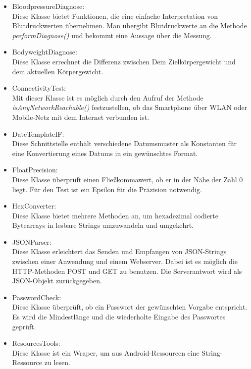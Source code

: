 \begin{itemize}
 \item BloodpressureDiagnose:\\
 Diese Klasse bietet Funktionen, die eine einfache Interpretation von Blutdruckwerten \"ubernehmen.
 Man \"ubergibt Blutdruckwerte an die Methode \emph{performDiagnose()} und bekommt eine Aussage \"uber die Messung.
  
 \item BodyweightDiagnose:\\
 Diese Klasse errechnet die Differenz zwischen Dem Zielk\"orpergewicht und dem aktuellen K\"orpergewicht.
 
 \item ConnectivityTest:\\
 Mit dieser Klasse ist es m\"oglich durch den Aufruf der Methode \emph{isAnyNetworkReachable()} festzustellen,
 ob das Smartphone \"uber WLAN oder Mobile-Netz mit dem Internet verbunden ist.
 
 \item DateTemplateIF:\\
 Diese Schnittstelle enth\"alt verschiedene Datumsmuster als Konstanten f\"ur eine Konvertierung eines Datums in ein 
 gew\"unschtes Format.
 \item FloatPrecision:\\
 Diese Klasse \"uberpr\"uft einen Flie\ss{}kommawert, ob er in der N\"ahe der Zahl 0 liegt. 
 F\"ur den Test ist ein Epsilon f\"ur die Pr\"azision notwendig.
 
 \item HexConverter:\\
 Diese Klasse bietet mehrere Methoden an, um hexadezimal codierte Bytearrays in lesbare Strings umzuwandeln und umgekehrt.
 
 \item JSONParser:\\
 Diese Klasse erleichtert das Senden und Empfangen von JSON-Strings zwischen einer Anwendung und einem Webserver.
 Dabei ist es m\"oglich die HTTP-Methoden POST und GET zu benutzen.
 Die Serverantwort wird als JSON-Objekt zur\"uckgegeben.
 
 \item PasswordCheck:\\
 Diese Klasse \"uberpr\"uft, ob ein Passwort der gew\"unschten Vorgabe entspricht.
 Es wird die Mindestl\"ange und die wiederholte Eingabe des Passwortes gepr\"uft.
 
 \item ResourcesTools:\\
 Diese Klasse ist ein Wraper, um aus Android-Ressourcen eine String-Ressource zu lesen.
 

\end{itemize}
